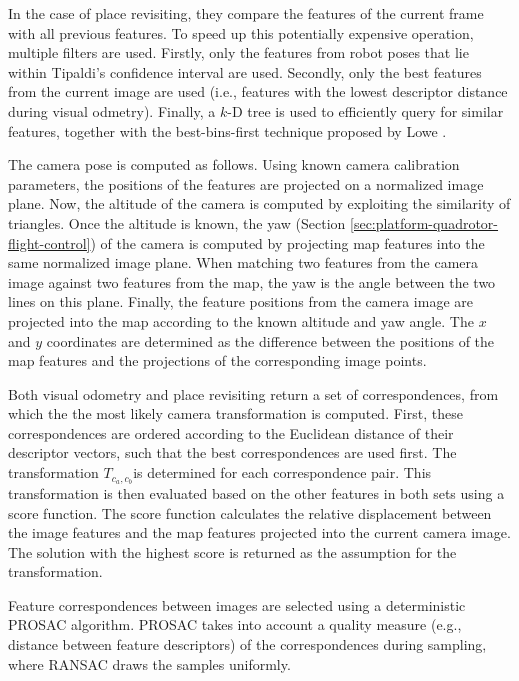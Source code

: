 In the case of place revisiting, they compare the features of the current frame with all previous features.
To speed up this potentially expensive operation, multiple filters are used.
Firstly, only the features from robot poses that lie within Tipaldi's confidence interval \cite{tipaldi2007approximate} are used.
Secondly, only the best features from the current image are used (i.e., features with the lowest descriptor distance during visual odmetry).
Finally, a $k$-D tree is used to efficiently query for similar features, together with the best-bins-first technique proposed by Lowe \cite{lowe1999object}.

The camera pose is computed as follows.
Using known camera calibration parameters, the positions of the features are projected on a normalized image plane.
Now, the altitude of the camera is computed by exploiting the similarity of triangles.
Once the altitude is known, the yaw (Section \ref{sec:platform-quadrotor-flight-control}) of the camera is computed by projecting map features 
into the same normalized image plane.
When matching two features from the camera image against two features from the map, the yaw is the angle between the two  lines on this plane.
Finally, the feature positions from the camera image are projected into the map according to the known altitude and yaw angle.
The $x$ and $y$ coordinates are determined as the difference between the positions of the map features and the projections of the corresponding image points.

Both visual odometry and place revisiting return a set of correspondences, from which the the most likely camera transformation is computed.
First, these correspondences are ordered according to the Euclidean distance of their descriptor vectors, such that the best correspondences are used first.
The transformation $T_{c_a,c_b}$is determined for each correspondence pair.
This transformation is then evaluated based on the other features in both sets using a score function.
The score function calculates the relative displacement between the image features and the map features projected into the current camera image.
The solution with the highest score is returned as the assumption for the transformation.

Feature correspondences between images are selected using a deterministic PROSAC \cite{chum2005matching} algorithm.
PROSAC takes into account a quality measure (e.g., distance between feature descriptors) of the correspondences during sampling, where RANSAC draws the samples uniformly.

